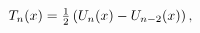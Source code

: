 \[\mathop{T_{n}\/}\nolimits\!\left(x\right)=\tfrac{1}{2}\left(\mathop{U_{n}\/}%
\nolimits\!\left(x\right)-\mathop{U_{n-2}\/}\nolimits\!\left(x\right)\right),\]
